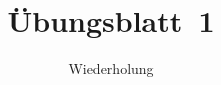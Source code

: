 
\title{Übungsblatt~1}
\subtitle{Wiederholung}
\maketitle




\beamertxt{\pagebreak}



\begin{deeper}

\end{deeper}


